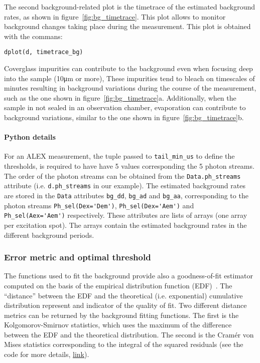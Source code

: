 The second background-related plot is the timetrace of the estimated background rates, 
as shown in figure~\ref{fig:bg_timetrace}. This plot allows to monitor background changes
taking place during the measurement. This plot is obtained with the commans:

\begin{lstlisting}
dplot(d, timetrace_bg)
\end{lstlisting}

Coverglass impurities can contribute to the background even when focusing 
deep into the sample (10μm or more),
These impurities tend to bleach on timescales of minutes resulting in
background variations during the course of the measurement, such as
the one shown in figure~\ref{fig:bg_timetrace}a.
Additionally, when the sample in not sealed in an observation chamber,
evaporation can contribute to background variations, similar to the
one shown in figure~\ref{fig:bg_timetrace}b.

\paragraph{Python details} For an ALEX measurement, the tuple passed to
\verb|tail_min_us| to define the thresholds, is required to have have 
5 values corresponding the 5 photon streams. 
The order of the photon streams can be obtained from
the \verb|Data.ph_streams| attribute (i.e. \verb|d.ph_streams| in our example).
The estimated background rates are stored in the \verb|Data| attributes
\verb|bg_dd|, \verb|bg_ad| and \verb|bg_aa|, corresponding to the photon
streams \verb|Ph_sel(Dex='Dem')|, \verb|Ph_sel(Dex='Aem')| and \verb|Ph_sel(Aex='Aem')|
respectively. These attributes are lists of arrays (one array per excitation spot).
The arrays contain the estimated background rates in the different background periods.

\subsubsection{Error metric and optimal threshold}

The functions used to fit the background provide also a goodness-of-fit estimator 
computed on the basis of the empirical distribution function (EDF)~\cite{Stephens1974,Parr1980}. 
The ``distance'' between the EDF and the theoretical (i.e. exponential) cumulative distribution
represent and indicator of the quality of fit.
Two different distance metrics can be returned by the background fitting functions.
The first is the Kolgomorov-Smirnov statistics, which uses the maximum of the difference 
between the EDF and the theoretical distribution. The second is the Cramér von Mises
statistics corresponding to the integral of the squared residuals
(see the code for more details,
\href{https://github.com/tritemio/FRETBursts/blob/master/fretbursts/background.py#L41}{link}).

